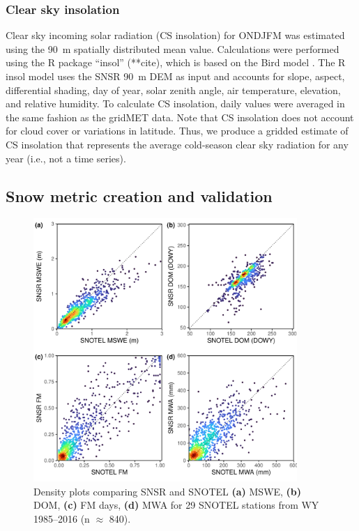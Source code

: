 \hypertarget{ch2-do-2}{\subsubsection{Clear sky insolation}\label{ch2-do-2}}

Clear sky incoming solar radiation (CS insolation) for ONDJFM was estimated using the 90~m spatially distributed mean value. Calculations were performed using the R package “insol” (**cite), which is based on the Bird model \citep{birdReviewEvaluationImprovement1981}. The R insol model uses the SNSR 90~m DEM as input and accounts for slope, aspect, differential shading, day of year, solar zenith angle, air temperature, elevation, and relative humidity. To calculate CS insolation, daily values were averaged in the same fashion as the gridMET data. Note that CS insolation does not account for cloud cover or variations in latitude. Thus, we produce a gridded estimate of CS insolation that represents the average cold-season clear sky radiation for any year (i.e., not a time series).


\hypertarget{ch2-methods-1}{\subsection{Snow metric creation and validation}\label{ch2-methods-1}}

\begin{figure}[t]
\centering
\includegraphics[width=10cm]{figures/ch2_figs/snsr_snotel_metric_compare_new_v1.pdf}
\caption{Density plots comparing SNSR and SNOTEL \textbf{(a)} MSWE, \textbf{(b)} DOM, \textbf{(c)} FM days, \textbf{(d)} MWA for 29 SNOTEL stations from WY 1985--2016 (n $\approx$ 840).}
\label{kuy_study_area}
\end{figure}

